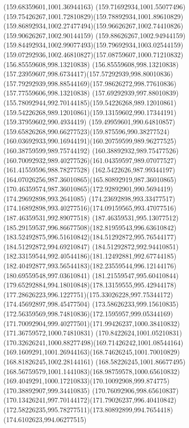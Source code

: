 {{	\lineto(159.68359601,1001.36944163)
	\curveto(159.71692934,1001.55077496)(159.75426267,1001.72810829)(159.78892934,1001.89610829)
	\curveto(159.86892934,1002.27477494)(159.96626267,1002.74410826)(159.90626267,1002.90144159)
	\curveto(159.88626267,1002.94944159)(159.84492934,1002.99077493)(159.79692934,1003.02544159)
	\curveto(159.07292936,1002.46810827)(157.08759607,1000.71210832)(156.85559608,998.13210838)
	\curveto(156.85559608,998.13210838)(157.23959607,998.6734417)(157.57292939,998.80010836)
	\curveto(157.79292939,998.88544169)(157.98626272,998.77610836)(157.77559606,998.13210838)
	\curveto(157.69292939,997.88010839)(155.78092944,992.70144185)(159.54226268,989.12010861)
	\curveto(159.54226268,989.12010861)(159.13159602,990.17344191)(159.37959602,990.4934419)
	\curveto(159.49959601,990.64810857)(159.65826268,990.66277523)(159.875596,990.38277524)
	\curveto(160.03692933,990.16944191)(160.20759599,989.96277525)(160.38759599,989.75744192)
	\lineto(160.38892932,989.75477526)
	\curveto(160.70092932,989.40277526)(161.04359597,989.07077527)(161.41559596,988.78277528)
	\curveto(162.5422626,987.99344197)(164.07026256,987.36010865)(165.80892919,987.36010865)
	\curveto(170.46359574,987.36010865)(172.92892901,990.5694419)(174.29692898,993.2641085)
	\curveto(174.23692898,993.33477517)(174.16892898,993.40277516)(174.09159565,993.47077516)
	\moveto(187.46359531,992.89077518)
	\curveto(187.46359531,995.13077512)(185.29159537,996.86677508)(182.81959543,996.63610842)
	\curveto(183.52492875,996.51610842)(184.51292872,995.76544177)(184.51292872,994.69210847)
	\curveto(184.51292872,992.94410851)(182.33159544,992.40544186)(181.12492881,992.67744185)
	\curveto(182.40492877,993.56544183)(182.23559544,996.12144176)(180.69559548,997.03610841)
	\curveto(181.21559547,995.60410844)(179.65292884,994.18010848)(178.13159555,995.42944178)
	\curveto(177.28626223,996.1227751)(175.33026228,997.75344172)(174.45692897,998.45477504)
	\curveto(173.58626233,999.15610835)(172.56359569,998.74810836)(172.1595957,999.05344169)
	\curveto(171.70092904,999.40277501)(171.99426237,1000.38410832)(171.36759572,1000.74810831)
	\curveto(170.8422624,1001.05210831)(170.32626241,1000.88277498)(169.71426242,1001.08544164)
	\curveto(169.1609291,1001.26944163)(168.74626245,1001.70010829)(168.81826245,1002.28144161)
	\curveto(168.58226245,1001.86677495)(168.56759579,1001.1441083)(168.98759578,1000.65610832)
	\curveto(169.4049291,1000.17210833)(170.10092908,999.874775)(170.38892907,999.34410835)
	\curveto(170.76092906,998.65610837)(170.13426241,997.70144172)(171.79026237,996.40410842)
	\curveto(172.58226235,995.78277511)(173.80892899,994.7654418)(174.6102623,994.06277515)
}}
